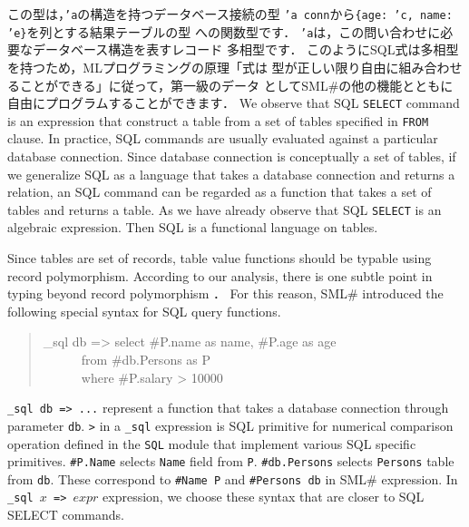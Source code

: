 \documentclass{jbook}
\newcommand{\smlsharp}{SML\#}
\newcommand{\myem}{\mbox{\ \ }}
\newenvironment{program}{\begin{quote}\begin{tt}}%
                        {\end{tt}\end{quote}}
\begin{document}
	この型は，{\tt 'a}の構造を持つデータベース接続の型
{\tt  'a conn}から{\tt \{age: 'c, name: 'e\}}を列とする結果テーブルの型
への関数型です．
	{\tt 'a}は，この問い合わせに必要なデータベース構造を表すレコード
多相型です．
	このようにSQL式は多相型を持つため，MLプログラミングの原理「式は
型が正しい限り自由に組み合わせることができる」に従って，第一級のデータ
として\smlsharp{}の他の機能とともに自由にプログラムすることができます．
\else%
	We observe that SQL {\tt SELECT} command is an expression that
construct a table from a set of tables specified in {\tt FROM} clause.
	In practice, SQL commands are usually evaluated against a
particular database connection.
	Since database connection is conceptually a set of tables, 
if we generalize SQL as a language that takes a database connection and
returns a relation, an SQL command can be regarded as a function that
takes a set of tables and returns a table.
	As we have already observe that SQL {\tt SELECT} is an algebraic
expression.
	Then SQL is a functional language on tables.

	Since tables are set of records, table value functions should be
typable using record polymorphism.
	According to our analysis, there is one subtle point in typing
beyond record polymorphism \cite{ohori11}．
	For this reason, \smlsharp{} introduced the following special
syntax for SQL query functions.
\begin{program}
\_sql db => select \#P.name as name, \#P.age as age\\
\myem\myem\myem from \#db.Persons as P\\
\myem\myem\myem where \#P.salary > 10000
\end{program}
	{\tt \_sql db => ...} represent a function that takes a database
connection through parameter {\tt db}.
	{\tt >} in a {\tt \_sql} expression is SQL primitive
for numerical comparison operation
defined in the {\tt SQL} module that implement various SQL specific
primitives.
	{\tt \#P.Name} selects {\tt Name} field from {\tt P}.
{\tt \#db.Persons} selects {\tt Persons} table from {\tt db}.
	These correspond to {\tt \#Name P} and {\tt \#Persons db} in
\smlsharp{} expression.
	In {\tt \_sql $x$ => $expr$} expression, we choose these syntax
that are closer to SQL SELECT commands.
	
\end{document}
